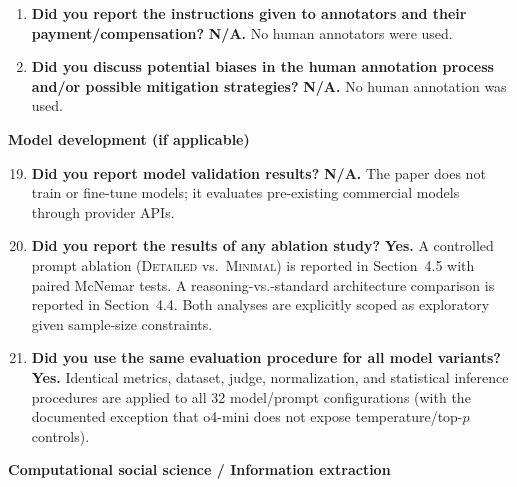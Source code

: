 \documentclass[11pt,a4paper]{article}
\begin{document}
\begin{enumerate}
\item \textbf{Did you report the instructions given to annotators and
  their payment/compensation?}
  \textbf{N/A.} No human annotators were used.

\item \textbf{Did you discuss potential biases in the human annotation
  process and/or possible mitigation strategies?}
  \textbf{N/A.} No human annotation was used.

\end{enumerate}

\noindent\textbf{Model development (if applicable)}

\begin{enumerate}
\setcounter{enumi}{18}

\item \textbf{Did you report model validation results?}
  \textbf{N/A.} The paper does not train or fine-tune models; it
  evaluates pre-existing commercial models through provider APIs.

\item \textbf{Did you report the results of any ablation study?}
  \textbf{Yes.} A controlled prompt ablation (\textsc{Detailed} vs.\
  \textsc{Minimal}) is reported in Section~4.5 with paired McNemar
  tests. A reasoning-vs.-standard architecture comparison is reported
  in Section~4.4. Both analyses are explicitly scoped as exploratory
  given sample-size constraints.

\item \textbf{Did you use the same evaluation procedure for all model
  variants?}
  \textbf{Yes.} Identical metrics, dataset, judge, normalization, and
  statistical inference procedures are applied to all 32
  model/prompt configurations (with the documented exception that
  o4-mini does not expose temperature/top-$p$ controls).

\end{enumerate}

\noindent\textbf{Computational social science / Information extraction}
\end{document}

